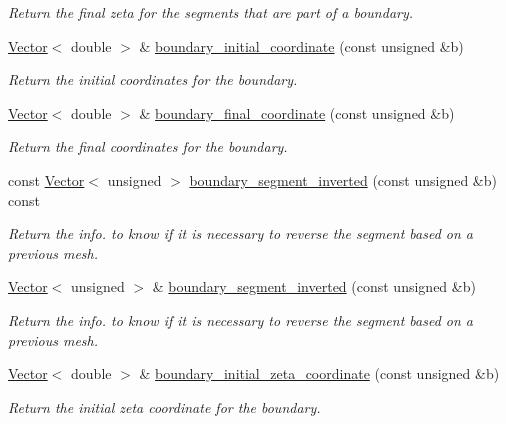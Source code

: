 \begin{DoxyCompactItemize}
\begin{DoxyCompactList}\small\item\em Return the final zeta for the segments that are part of a boundary. \end{DoxyCompactList}\item 
\hyperlink{classoomph_1_1Vector}{Vector}$<$ double $>$ \& \hyperlink{classoomph_1_1UnstructuredTwoDMeshGeometryBase_a9722a9b359c6ef422e423067416d3018}{boundary\+\_\+initial\+\_\+coordinate} (const unsigned \&b)
\begin{DoxyCompactList}\small\item\em Return the initial coordinates for the boundary. \end{DoxyCompactList}\item 
\hyperlink{classoomph_1_1Vector}{Vector}$<$ double $>$ \& \hyperlink{classoomph_1_1UnstructuredTwoDMeshGeometryBase_ab89b546b971d716e13157e3758c8b3ef}{boundary\+\_\+final\+\_\+coordinate} (const unsigned \&b)
\begin{DoxyCompactList}\small\item\em Return the final coordinates for the boundary. \end{DoxyCompactList}\item 
const \hyperlink{classoomph_1_1Vector}{Vector}$<$ unsigned $>$ \hyperlink{classoomph_1_1UnstructuredTwoDMeshGeometryBase_a0ff7b48dd70784f8128cd5ec494e3efa}{boundary\+\_\+segment\+\_\+inverted} (const unsigned \&b) const
\begin{DoxyCompactList}\small\item\em Return the info. to know if it is necessary to reverse the segment based on a previous mesh. \end{DoxyCompactList}\item 
\hyperlink{classoomph_1_1Vector}{Vector}$<$ unsigned $>$ \& \hyperlink{classoomph_1_1UnstructuredTwoDMeshGeometryBase_aad1837f55c6d5c9788e80e8cfa3db365}{boundary\+\_\+segment\+\_\+inverted} (const unsigned \&b)
\begin{DoxyCompactList}\small\item\em Return the info. to know if it is necessary to reverse the segment based on a previous mesh. \end{DoxyCompactList}\item 
\hyperlink{classoomph_1_1Vector}{Vector}$<$ double $>$ \& \hyperlink{classoomph_1_1UnstructuredTwoDMeshGeometryBase_ab631fe3d2b7f0d4ac7155d0636db7c3b}{boundary\+\_\+initial\+\_\+zeta\+\_\+coordinate} (const unsigned \&b)
\begin{DoxyCompactList}\small\item\em Return the initial zeta coordinate for the boundary. \end{DoxyCompactList}\item 

\end{DoxyCompactItemize}
